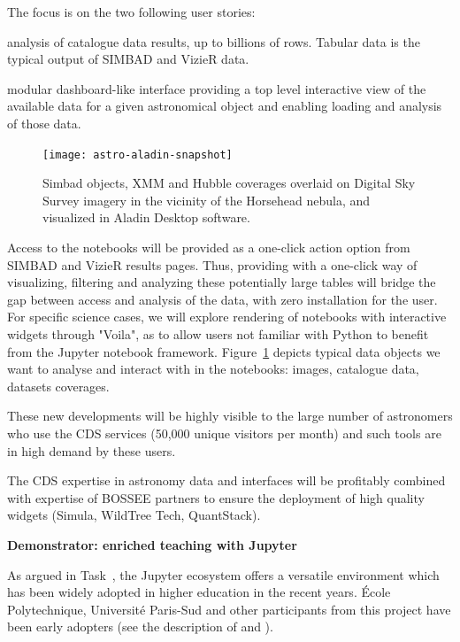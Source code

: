   The focus is on the two following user stories:
    \begin{compactitem}
        \item analysis of catalogue data results, up to billions of rows.
              Tabular data is the typical output of SIMBAD and VizieR data.
        \item modular dashboard-like interface providing a top level
              interactive view of the available data for a given astronomical
              object and enabling loading and analysis of those data.
    \end{compactitem}


\begin{figure}[ht!]\centering
  \texttt{[image: astro-aladin-snapshot]}
  \caption{Simbad objects, XMM and Hubble coverages overlaid on Digital Sky Survey imagery in the vicinity of the Horsehead nebula, and visualized in Aladin Desktop software.}\label{fig:astro-aladin-snapshot}
\end{figure}

  Access to the notebooks will be provided as a one-click action option from
  SIMBAD and VizieR results pages.
  Thus, providing with a one-click way of visualizing, filtering and analyzing
these potentially large tables will bridge the gap between access and analysis
of the data, with zero installation for the user.
  For specific science cases, we will explore rendering of notebooks with
  interactive widgets through "Voila", as to allow users not familiar with
  Python to benefit from the Jupyter notebook framework.
  Figure~\ref{fig:astro-aladin-snapshot} depicts typical data objects we want to analyse and interact with in the notebooks: images, catalogue data, datasets coverages.

  These new developments will be highly visible to the large number of astronomers who use the CDS services (50,000 unique visitors per month) and such tools are in high demand by these users.

  The CDS expertise in astronomy data and interfaces will be profitably combined with expertise of BOSSEE partners to ensure the deployment of high quality widgets (Simula, WildTree Tech, QuantStack).

\medskip
\textbf{Demonstrator: enriched teaching with Jupyter}

  As argued in Task~, the Jupyter
  ecosystem offers a versatile environment which has been widely
  adopted in higher education in the recent years. École
  Polytechnique, Université Paris-Sud and other participants from this
  project have been early adopters (see the description of 
  and ).

